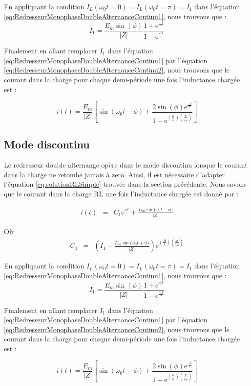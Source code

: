 En appliquant la condition $I_L(\omega_0 t = 0)=I_L(\omega_0 t=\pi)=I_1$ dans l'équation \ref{eq:RedresseurMonophaseDoubleAlternanceContinu1}, nous trouvons que :
\begin{equation}
\label{eq:RedresseurMonophaseDoubleAlternanceContinu2}
	I_1 = \frac{E_m\sin{(\phi)}}{|Z|}  \frac{1 + \mbox{e}^{\frac{-1}{\tau}}}{1 - \mbox{e}^{\frac{-1}{\tau}}}
\end{equation}

Finalement en allant remplacer $I_1$ dans l'équation \ref{eq:RedresseurMonophaseDoubleAlternanceContinu1} par l'équation \ref{eq:RedresseurMonophaseDoubleAlternanceContinu2}, nous trouvons que le courant dans la charge pour chaque demi-période une fois l'inductance chargée est :

\begin{equation}
	i(t) = \frac{E_m}{|Z|}\left[\sin{(\omega_0 t - \phi)} + \frac{2\sin(\phi) \mbox{e}^{\frac{-t}{\tau}}}{1-\mbox{e}^{\left(\frac{R}{L}\right)\left(\frac{\pi}{\omega_0}\right)}} \right] 
\end{equation}

\subsection{Mode discontinu}
Le redresseur double alternange opère dans le mode discontinu lorsque le courant dans la charge ne retombe jamais à zero. Ainsi, il est nécessaire d'adapter l'équation \ref{eq:solutionRLSimple} trouvée dans la section précédente. Nous savons que le courant dans la charge RL une fois l'inductance chargée est donné par :

\begin{eqnarray}
\label{eq:RedresseurMonophaseDoubleAlternanceContinu1}
i(t) &=& C_1\mbox{e}^{\frac{-t}{\tau}} + \frac{E_m\sin{(\omega_0 t - \phi})}{|Z|}
\end{eqnarray}

Où:
\begin{eqnarray}
C_1 &=& \left( I_1 - \frac{E_m\sin{(\omega_0 t + \phi})}{|Z|}\right)\mbox{e}^{\left(\frac{R}{L}\right)\left(\frac{\pi}{\omega_0}\right)}
\end{eqnarray}

En appliquant la condition $I_L(\omega_0 t = 0)=I_L(\omega_0 t=\pi)=I_1$ dans l'équation \ref{eq:RedresseurMonophaseDoubleAlternanceContinu1}, nous trouvons que :
\begin{equation}
\label{eq:RedresseurMonophaseDoubleAlternanceContinu2}
	I_1 = \frac{E_m\sin{(\phi)}}{|Z|}  \frac{1 + \mbox{e}^{\frac{-1}{\tau}}}{1 - \mbox{e}^{\frac{-1}{\tau}}}
\end{equation}

Finalement en allant remplacer $I_1$ dans l'équation \ref{eq:RedresseurMonophaseDoubleAlternanceContinu1} par l'équation \ref{eq:RedresseurMonophaseDoubleAlternanceContinu2}, nous trouvons que le courant dans la charge pour chaque demi-période une fois l'inductance chargée est :

\begin{equation}
	i(t) = \frac{E_m}{|Z|}\left[\sin{(\omega_0 t - \phi)} + \frac{2\sin(\phi) \mbox{e}^{\frac{-t}{\tau}}}{1-\mbox{e}^{\left(\frac{R}{L}\right)\left(\frac{\pi}{\omega_0}\right)}} \right] 
\end{equation}